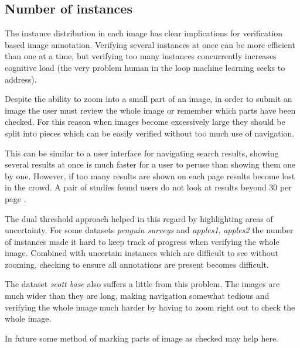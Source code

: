 \subsection{Number of instances}
\label{sec:instances_discussion}

The instance distribution in each image has clear implications for verification based image annotation. Verifying several instances at once can be more efficient than one at a time, but verifying too many instances concurrently increases cognitive load (the very problem human in the loop machine learning seeks to address). 

Despite the ability to zoom into a small part of an image, in order to submit an image the user must review the whole image or remember which parts have been checked. For this reason when images become excessively large they should be split into pieces which can be easily verified without too much use of navigation.

This can be similar to a user interface for navigating search results, showing several results at once is much faster for a user to peruse than showing them one by one. However, if too many results are shown on each page results become lost in the crowd. A pair of studies found users do not look at results beyond 30 per page \cite{PunchoojitLumpapun2017, Zhou2007}.

The dual threshold approach helped in this regard by highlighting areas of uncertainty. For some datasets \emph{penguin surveys} and \emph{apples1}, \emph{apples2} the number of instances made it hard to keep track of progress when verifying the whole image. Combined with uncertain instances which are difficult to see without zooming, checking to ensure all annotations are present becomes difficult.

The dataset \emph{scott base} also suffers a little from this problem. The images are much wider than they are long, making navigation somewhat tedious and verifying the whole image much harder by having to zoom right out to check the whole image.

In future some method of marking parts of image as checked may help here.


